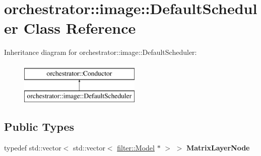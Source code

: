 \hypertarget{classorchestrator_1_1image_1_1_default_scheduler}{}\section{orchestrator\+:\+:image\+:\+:Default\+Scheduler Class Reference}
\label{classorchestrator_1_1image_1_1_default_scheduler}
Inheritance diagram for orchestrator\+:\+:image\+:\+:Default\+Scheduler\+:\begin{figure}[H]
\begin{center}
\leavevmode
\includegraphics[height=2.000000cm]{d9/d04/classorchestrator_1_1image_1_1_default_scheduler}
\end{center}
\end{figure}
\subsection*{Public Types}
\begin{DoxyCompactItemize}
\item 
\mbox{\label{classorchestrator_1_1image_1_1_default_scheduler_a050a53553d53c862899d7ac75acb7bb7}} 
typedef std\+::vector$<$ std\+::vector$<$ \hyperlink{classfilter_1_1_model}{filter\+::\+Model} $\ast$ $>$ $>$ {\bfseries Matrix\+Layer\+Node}
\end{DoxyCompactItemize}
